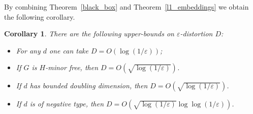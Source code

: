 \documentclass[12pt]{article}
\newcommand{\eps}{\varepsilon}
\newtheorem{corollary}{Corollary}
\begin{document}
    By combining Theorem~\ref{black_box} and Theorem~\ref{l1_embeddings} we obtain the following corollary.
    \begin{corollary}
        There are the following upper-bounds on $\eps$-distortion $D$:
        \begin{itemize}
            \item For any $d$ one can take $D = O(\log (1 / \eps))$;
            \item If $G$ is $H$-minor free, then $D = O(\sqrt{\log (1 / \eps)})$. 
            \item If $d$ has bounded doubling dimension, then $D = O(\sqrt{\log (1 / \eps)})$.
            \item If $d$ is of negative type, then $D = O(\sqrt{\log (1 / \eps)} \log \log (1 / \eps))$. 
        \end{itemize}
    \end{corollary}

    
    
\end{document}
